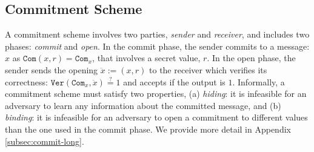 
\vspace{-2.5mm}


\subsection{Commitment Scheme}\label{subsec:commit}


A commitment scheme involves two parties,  \emph{sender} and  \emph{receiver}, and includes  two phases: \emph{commit} and  \emph{open}. In the commit phase, the sender  commits to a message: $x$ as $\mathtt{Com}(x,r)=\mathtt{Com}_{\scriptscriptstyle x}$, that involves a secret value,  $r$. In the open phase, the sender sends the opening $\ddot{x}:=(x,r)$ to the receiver which verifies its correctness: $\mathtt{Ver}(\mathtt{Com}_{\scriptscriptstyle x},\ddot{x})\stackrel{\scriptscriptstyle ?}=1$ and accepts if the output is $1$. Informally, a commitment scheme must satisfy two properties, (a) \textit{hiding}: it is infeasible for an adversary to learn any information about the committed  message, and (b) \textit{binding}: it is infeasible for an adversary to open a commitment  to different values  than the one  used in the commit phase. We provide more detail in Appendix \ref{subsec:commit-long}. 



